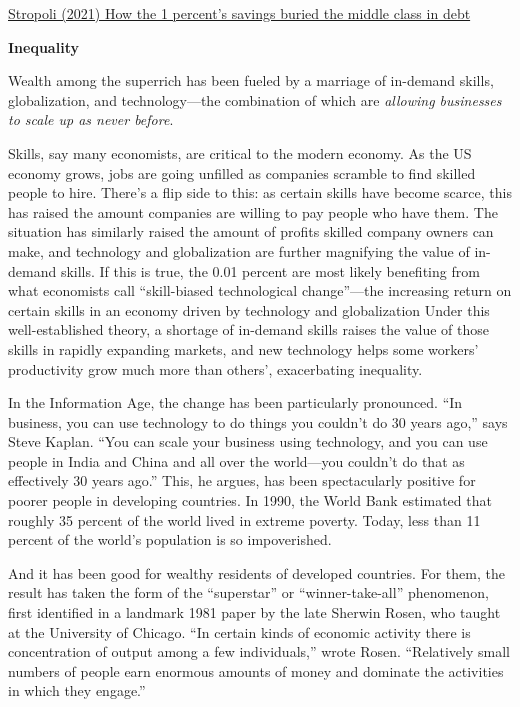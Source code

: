 \documentclass[
]{book}
\begin{document}
\href{https://review.chicagobooth.edu/economics/2021/article/how-1-percent-s-savings-buried-middle-class-debt}{Stropoli (2021) How the 1 percent's savings buried the middle class in debt}

\textbf{Inequality}

Wealth among the superrich has been fueled by a marriage of in-demand skills, globalization, and technology---the combination of which are \emph{allowing businesses to scale up as never before}.

Skills, say many economists, are critical to the modern economy. As the US economy grows, jobs are going unfilled as companies scramble to find skilled people to hire. There's a flip side to this: as certain skills have become scarce, this has raised the amount companies are willing to pay people who have them. The situation has similarly raised the amount of profits skilled company owners can make, and technology and globalization are further magnifying the value of in-demand skills.
If this is true, the 0.01 percent are most likely benefiting from what economists call ``skill-biased technological change''---the increasing return on certain skills in an economy driven by technology and globalization
Under this well-established theory, a shortage of in-demand skills raises the value of those skills in rapidly expanding markets, and new technology helps some workers' productivity grow much more than others', exacerbating inequality.

In the Information Age, the change has been particularly pronounced. ``In business, you can use technology to do things you couldn't do 30 years ago,'' says Steve Kaplan. ``You can scale your business using technology, and you can use people in India and China and all over the world---you couldn't do that as effectively 30 years ago.'' This, he argues, has been spectacularly positive for poorer people in developing countries. In 1990, the World Bank estimated that roughly 35 percent of the world lived in extreme poverty. Today, less than 11 percent of the world's population is so impoverished.

And it has been good for wealthy residents of developed countries. For them, the result has taken the form of the ``superstar'' or ``winner-take-all'' phenomenon, first identified in a landmark 1981 paper by the late Sherwin Rosen, who taught at the University of Chicago. ``In certain kinds of economic activity there is concentration of output among a few individuals,'' wrote Rosen. ``Relatively small numbers of people earn enormous amounts of money and dominate the activities in which they engage.''
\end{document}
